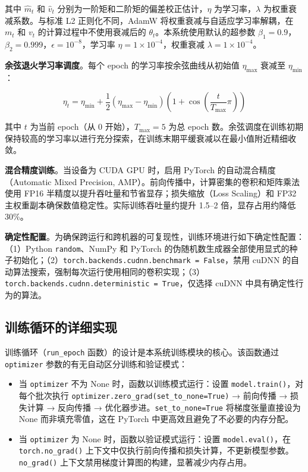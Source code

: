 \documentclass[12pt,a4paper,UTF8,openany]{ctexbook}
\begin{document}
其中 $\hat{m}_t$ 和 $\hat{v}_t$ 分别为一阶矩和二阶矩的偏差校正估计，$\eta$ 为学习率，$\lambda$ 为权重衰减系数。与标准 L2 正则化不同，AdamW 将权重衰减与自适应学习率解耦，在 $m_t$ 和 $v_t$ 的计算过程中不使用衰减后的 $\theta_t$。本系统使用默认的超参数 $\beta_1=0.9$，$\beta_2=0.999$，$\epsilon=10^{-8}$，学习率 $\eta=1\times10^{-4}$，权重衰减 $\lambda=1\times10^{-4}$。

\textbf{余弦退火学习率调度}。每个 epoch 的学习率按余弦曲线从初始值 $\eta_{\max}$ 衰减至 $\eta_{\min}$：

\begin{equation}
\eta_t = \eta_{\min} + \frac{1}{2}\left(\eta_{\max} - \eta_{\min}\right)\left(1 + \cos\left(\frac{t}{T_{\max}}\pi\right)\right)
\end{equation}

其中 $t$ 为当前 epoch（从 0 开始），$T_{\max} = 5$ 为总 epoch 数。余弦调度在训练初期保持较高的学习率以进行充分探索，在训练末期平缓衰减以在最小值附近精细收敛。

\textbf{混合精度训练}。当设备为 CUDA GPU 时，启用 PyTorch 的自动混合精度（Automatic Mixed Precision, AMP）。前向传播中，计算密集的卷积和矩阵乘法使用 FP16 半精度以提升吞吐量和节省显存；损失缩放（Loss Scaling）和 FP32 主权重副本确保数值稳定性。实际训练吞吐量约提升 1.5--2 倍，显存占用约降低 30\%。

\textbf{确定性配置}。为确保跨运行和跨机器的可复现性，训练环境进行如下确定性配置：（1）Python \texttt{random}、NumPy 和 PyTorch 的伪随机数生成器全部使用显式的种子初始化；（2）\texttt{torch.backends.cudnn.benchmark = False}，禁用 cuDNN 的自动算法搜索，强制每次运行使用相同的卷积实现；（3）\texttt{torch.backends.cudnn.deterministic = True}，仅选择 cuDNN 中具有确定性行为的算法。

\subsection{训练循环的详细实现}

训练循环（\texttt{run\_epoch} 函数）的设计是本系统训练模块的核心。该函数通过 \texttt{optimizer} 参数的有无自动区分训练和验证模式：

\begin{itemize}
  \item 当 \texttt{optimizer} 不为 None 时，函数以训练模式运行：设置 \texttt{model.train()}，对每个批次执行 \texttt{optimizer.zero\_grad(set\_to\_none=True)} → 前向传播 → 损失计算 → 反向传播 → 优化器步进。\texttt{set\_to\_none=True} 将梯度张量直接设为 None 而非填充零值，这在 PyTorch 中更高效且避免了不必要的内存分配。
  \item 当 \texttt{optimizer} 为 None 时，函数以验证模式运行：设置 \texttt{model.eval()}，在 \texttt{torch.no\_grad()} 上下文中仅执行前向传播和损失计算，不更新模型参数。\texttt{no\_grad()} 上下文禁用梯度计算图的构建，显著减少内存占用。
\end{itemize}
\end{document}
